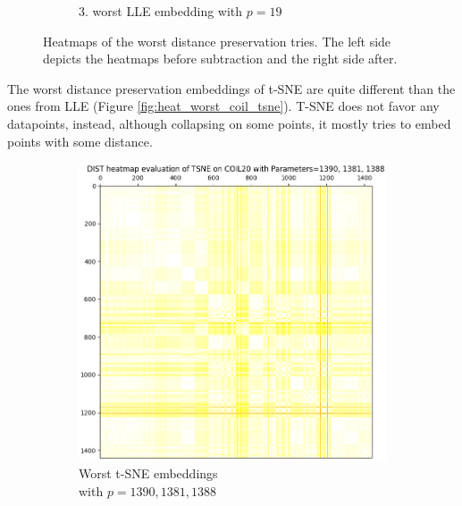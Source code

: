 \begin{figure}[!]
\begin{subfigure}[t]{0.49\columnwidth}
    	\caption{3. worst LLE embedding with $p=19$}
        \label{fig:dist_heatmap_lle_coil20_3worst}
    \end{subfigure}
     \caption[Heatmaps of Worst LLE Distance Preservations]{Heatmaps of the worst distance preservation tries. The left side depicts the heatmaps before subtraction and the right side after.}
    \label{fig:heat_worst_coil_lle}
\end{figure}

The worst distance preservation embeddings of t-SNE are quite different than the ones from LLE (Figure \ref{fig:heat_worst_coil_tsne}). T-SNE does not favor any datapoints, instead, although collapsing on some points, it mostly tries to embed points with some distance.

\begin{figure}[!]
     \centering
     \begin{subfigure}[t]{0.49\columnwidth}
    	\centering
    	\includegraphics[width=\columnwidth]{images/dist_heatmap_tsne_coil20_1-3wors_beforediff.png}
    	\caption{Worst t-SNE embeddings \\ with $p=1390,1381,1388$}
        \label{fig:dist_heatmap_tsne_coil20_1-3wors_beforediff}
    \end{subfigure}
     \hfill
     \begin{subfigure}[t]{0.49\columnwidth}
    	\centering

\end{subfigure}
\end{figure}
